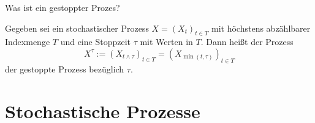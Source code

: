 \begin{QandA}
    \item Was ist ein gestoppter Prozes?
    \begin{answered}
        Gegeben sei ein stochastischer Prozess $X=(X_{t})_{t\in T}$ mit höchstens abzählbarer Indexmenge $T$ und eine Stoppzeit $\tau$ mit Werten in $T$.
        Dann heißt der Prozess
        \[
            X^{\tau} := (X_{t \land \tau })_{t\in T} = (X_{\min(t,\tau )})_{t\in T}
        \]
        der gestoppte Prozess bezüglich $\tau$.
    \end{answered}
\end{QandA}

\newpage
\section*{Stochastische Prozesse}

